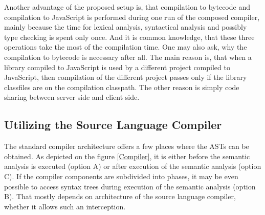 \documentclass[12pt,a4paper]{report}
\begin{document}
Another advantage of the proposed setup is, that compilation to bytecode and compilation to JavaScript is performed during one run of the composed compiler, mainly because the time for lexical analysis, syntactical analysis and possibly type checking is spent only once. And it is common knowledge, that these three operations take the most of the compilation time. One may also ask, why the compilation to bytecode is necessary after all. The main reason is, that when a library compiled to JavaScript is used by a different project compiled to JavaScript, then compilation of the different project passes only if the library classfiles are on the compilation classpath. The other reason is simply code sharing between server side and client side.

\subsection{Utilizing the Source Language Compiler}

The standard compiler architecture offers a few places where the ASTs can be obtained. As depicted on the figure \ref{Compiler}, it is either before the semantic analysis is executed (option A) or after execution of the semantic analysis (option C). If the compiler components are subdivided into phases, it may be even possible to access syntax trees during execution of the semantic analysis (option B). That mostly depends on architecture of the source language compiler, whether it allows such an interception.
\end{document}
